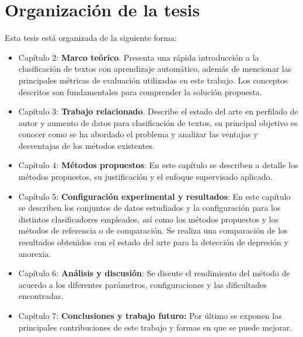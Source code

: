 \section{Organización de la tesis}

Esta tesis está organizada de la siguiente forma: 


\begin{itemize}
\item Capítulo 2: \textbf{Marco teórico}. Presenta una rápida introducción a la clasificación de textos con aprendizaje automático, además de mencionar las principales métricas de evaluación utilizadas en este trabajo. Los conceptos descritos son fundamentales para comprender la solución propuesta.


\item Capítulo 3: \textbf{Trabajo relacionado}. Describe el estado del arte en perfilado de autor y aumento de datos para clasificación de textos, su principal objetivo es conocer como se ha abordado el problema y  analizar las ventajas y desventajas de los métodos existentes.



\item Capítulo 4: \textbf{Métodos propuestos}: En este capítulo se describen a detalle los métodos propuestos, su justificación y el enfoque supervisado aplicado.

\item Capítulo 5: \textbf{Configuración experimental y resultados}: En este capítulo se describen los conjuntos de datos estudiados y la configuración para los distintos clasificadores empleados, así como los métodos propuestos y los métodos de referencia o de comparación. Se realiza una comparación de los resultados obtenidos con el estado del arte para la detección de depresión y anorexia.

\item Capítulo 6: \textbf{Análisis y discusión}: Se discute el rendimiento del método de acuerdo a los diferentes parámetros, configuraciones y las dificultades encontradas.

\item Capítulo 7: \textbf{Conclusiones y trabajo futuro:} Por último se exponen las principales contribuciones de este trabajo y formas en que se puede mejorar.

\end{itemize}

